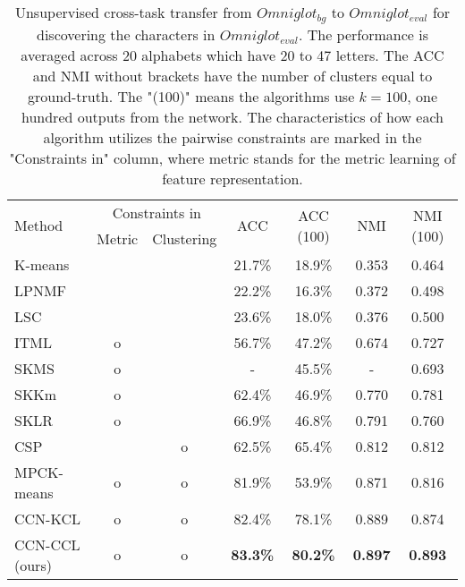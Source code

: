\documentclass[10pt,twocolumn,letterpaper]{article}
\begin{document}
\begin{table*}[]
\centering
\caption{Unsupervised cross-task transfer from $Omniglot_{bg}$ to $Omniglot_{eval}$ for discovering the characters in $Omniglot_{eval}$. The performance is averaged across 20 alphabets which have 20 to 47 letters. The ACC and NMI without brackets have the number of clusters equal to ground-truth.  The "(100)" means the algorithms use $k=100$, \ie one hundred outputs from the network. The characteristics of how each algorithm utilizes the pairwise constraints are marked in the "Constraints in" column, where metric stands for the metric learning of feature representation. }
\label{tab:crosstask-omnilgot}
\begin{tabular}{lcccccc}
\toprule
\multirow{2}{*}{Method} & \multicolumn{2}{c}{Constraints in} & \multirow{2}{*}{ACC} & \multirow{2}{*}{ACC (100)} & \multirow{2}{*}{NMI} & \multirow{2}{*}{NMI (100)} \\
                & Metric & Clustering &            &                              &                             &                              \\ \midrule
K-means \cite{macqueen1967some}        &     &      & 21.7\%    & 18.9\%  & 0.353   & 0.464  \\ 
LPNMF \cite{cai2009LPNMF}          &     &      & 22.2\%    & 16.3\%  & 0.372   & 0.498  \\
LSC \cite{chen2011LSC}            &     &      & 23.6\%    & 18.0\%  & 0.376   & 0.500  \\
ITML \cite{davis2007ITML}           & o   &      & 56.7\%    & 47.2\%  & 0.674   & 0.727  \\
SKMS \cite{anand2014SKMS}           & o   &      & -         & 45.5\%  & -       & 0.693  \\
SKKm \cite{anand2014SKMS}            & o   &      & 62.4\%    & 46.9\%  & 0.770   & 0.781  \\
SKLR \cite{amid2016SKLR}           & o   &      & 66.9\%    & 46.8\%  & 0.791   & 0.760  \\
CSP \cite{wang2014CSP}             &     & o    & 62.5\%    & 65.4\%  & 0.812   & 0.812  \\
MPCK-means \cite{bilenko2004MPCKMeans}     & o   & o    & 81.9\%    & 53.9\%  & 0.871   & 0.816  \\ 
CCN-KCL \cite{Hsu18iclr}            & o   & o    & 82.4\%    & 78.1\%  & 0.889   & 0.874  \\ \midrule
CCN-CCL (ours)     & o   & o    & \textbf{83.3\%}    & \textbf{80.2\%}  & \textbf{0.897}   & \textbf{0.893}  \\
\bottomrule                     
\end{tabular}
\end{table*}
\end{document}
